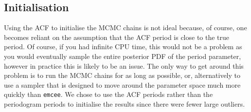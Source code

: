 \documentclass[useAMS, usenatbib, preprint, 12pt]{aastex}
\begin{document}
\subsection{Initialisation}
Using the ACF to initialise the MCMC chains is not ideal because, of course,
one becomes reliant on the assumption that the ACF period is close to the true
period.
Of course, if you had infinite CPU time, this would not be a problem as you
would eventually sample the entire posterior PDF of the period parameter,
however in practice this is likely to be an issue.
The only way to get around this problem is to run the MCMC chains for as long
as possible, or, alternatively to use a sampler that is designed to move
around the parameter space much more quickly than {\tt emcee}.
We chose to use the ACF periods rather than the periodogram periods to
initialise the results since there were fewer large outliers.
\end{document}
